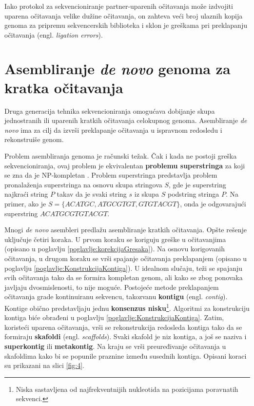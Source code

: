\documentclass[12pt,oneside]{memoir}
\begin{document}
Iako protokol za sekvencioniranje partner-uparenih očitavanja može izdvojiti uparena očitavanja velike dužine očitavanja, on zahteva veći broj ulaznih kopija genoma za pripremu sekvencerskih biblioteka i sklon je greškama pri preklapanju očitavanja (engl. \textit{ligation errors}).
\begin{comment}
(ligation errors - greškama prilikom preklapanja očitavanja)
\end{comment}


\section{Asembliranje \textit{de novo} genoma za kratka očitavanja}

Druga generacija tehnika sekvencioniranja omogućava dobijanje skupa jednostranih ili uparenih kratkih očitavanja celokupnog genoma. Asembliranje \textit{de novo} ima za cilj da izvrši preklapanje očitavanja u ispravnom redosledu i rekonstruiše genom.

Problem asembliranja genoma je računski težak. Čak i kada ne postoji greška sekvencioniranja, ovaj problem je ekvivalentan \textbf{problemu superstringa} za koji se zna da je NP-kompletan \cite{NPcomplexity}. Problem superstringa predstavlja problem pronalaženja superstringa na osnovu skupa stringova $S$, gde je superstring najkraći string $P$ takav da je svaki string $s$ iz skupa $S$ podstring stringa $P$. Na primer, ako je $S = \{ACATGC, ATGCGTGT, GTGTACGT\}$, onda je odgovarajući superstring $ACATGCGTGTACGT$.

Mnogi \textit{de novo} asembleri predlažu asembliranje kratkih očitavanja. Opšte rešenje uključuje četiri koraka. U prvom koraku se koriguju greške u očitavanjima (opisano u poglavlju \ref{poglavlje:korekcijaGresaka}). Na osnovu korigovanih očitavanja, u drugom koraku se vrši spajanje očitavanja preklapanjem (opisano u poglavlju \ref{poglavlje:KonstrukcijaKontiga}). U idealnom slučaju, teži se spajanju svih očitavanja tako da se formira kompletan genom, ali kako se zbog ponovaka javljaju dvosmislenosti, to nije moguće. Postojeće metode preklapanjem očitavanja grade kontinuiranu sekvencu, takozvanu \textbf{kontigu} (engl. \textit{contig}). Kontige obično predstavljaju jednu \textbf{konsenzus nisku}\footnote{Niska sastavljena od najfrekventnijih nukleotida na pozicijama poravnatih sekvenci.}. Algoritmi za konstrukciju kontiga biće obrađeni u poglavlju \ref{poglavlje:KonstrukcijaKontiga}. Zatim, koristeći uparena očitavanja, vrši se rekonstrukcija redosleda kontiga tako da se formiraju \textbf{skafoldi} (engl. \textit{scaffolds}). Svaki skafold je niz kontiga, a još se naziva i \textbf{superkontig} ili \textbf{metakontig}. Na kraju se vrši preuređivanje očitavanja u skafoldima kako bi se popunile praznine između susednih kontiga. Opisani koraci su prikazani na slici \ref{fig:4}.
\end{document}
